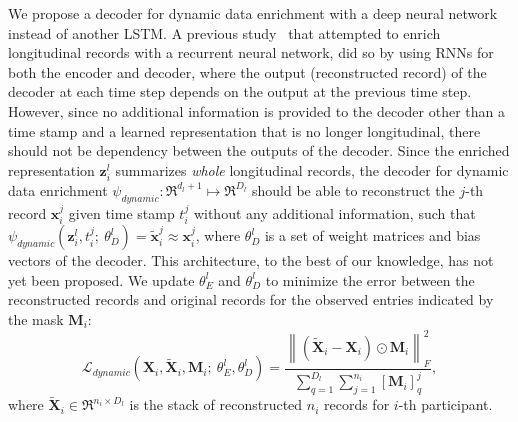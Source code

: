 We propose a decoder for dynamic data enrichment with a deep neural network instead of another LSTM. A previous study~\cite{srivastava2015unsupervised} that attempted to enrich longitudinal records with a recurrent neural network, did so by using RNNs for both the encoder and decoder, where the output (reconstructed record) of the decoder at each time step depends on the output at the previous time step. However, since no additional information is provided to the decoder other than a time stamp and a learned representation that is no longer longitudinal, there should not be dependency between the outputs of the decoder. Since the enriched representation $\mathbf{z}_i^l$ summarizes \emph{whole} longitudinal records, the decoder for dynamic data enrichment $\psi_{dynamic}:\Re^{d_l + 1} \mapsto \Re^{D_l}$ should be able to reconstruct the $j$-th record $\mathbf{x}_i^j$ given time stamp $t_i^j$ without any additional information, such that $\psi_{dynamic}(\mathbf{z}_i^l, t^j_i;\ \theta^l_{D}) = \tilde{\mathbf{x}}_i^j \approx \mathbf{x}_i^j$, where $\theta^l_{D}$ is a set of weight matrices and bias vectors of the decoder. This architecture, to the best of our knowledge, has not yet been proposed. We update $\theta^l_{E}$ and $\theta^l_{D}$ to minimize the error between the reconstructed records and original records for the observed entries indicated by the mask $\mathbf{M}_i$:
\begin{equation}
    \mathcal{L}_{dynamic}(\mathbf{X}_i, \tilde{\mathbf{X}}_i, \mathbf{M}_i;\ 
    \theta^l_{E}, \theta^l_{D}) = \frac{\left\| (\tilde{\mathbf{X}}_i
- \mathbf{X}_i) \odot \mathbf{M}_i
\right\|_F^2}{\sum_{q=1}^{D_l}\sum_{j=1}^{n_i}[\mathbf{M}_i]^j_q},
\end{equation}
where $\tilde{\mathbf{X}}_i \in \Re^{n_i \times D_l}$ is the stack of reconstructed $n_i$ records for $i$-th participant. 


